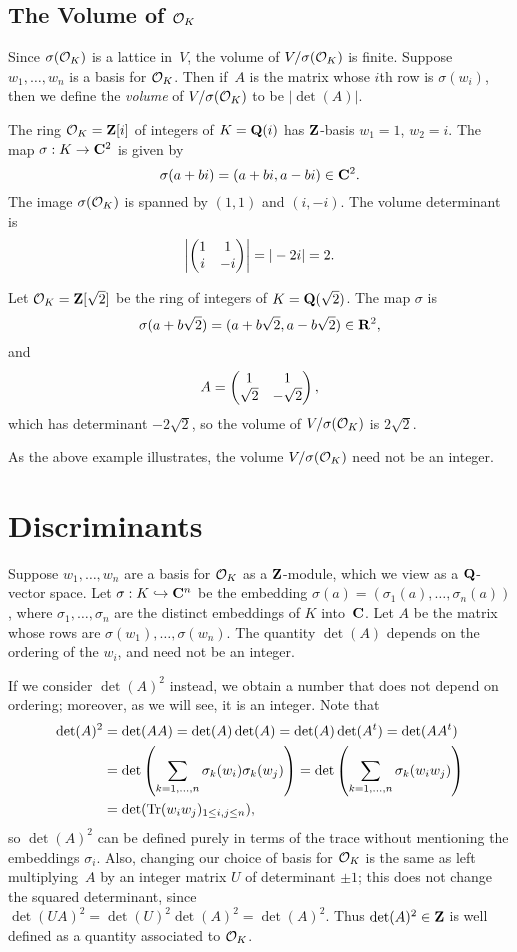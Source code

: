 \subsection{The Volume of $\mathcal{O}_K$}
Since $\sigma(\mathcal{O}_K)$ is a lattice in~$V$, the volume of
$V/\sigma(\mathcal{O}_K)$ is finite.  Suppose $w_1,\ldots, w_n$ is a basis for
$\mathcal{O}_K$.  Then if~$A$ is the matrix whose $i$th row is $\sigma(w_i)$,
then we define the {\em volume} of $V/\sigma(\mathcal{O}_K)$ to be 
$|\det(A)|$.
\begin{example}
The ring $\mathcal{O}_K=\mathbf{Z}[i]$ of integers of $K=\mathbf{Q}(i)$
has $\mathbf{Z}$-basis $w_1=1$, $w_2=i$.
The map $\sigma:K\to \mathbf{C}^2$ is given by 
$$
   \sigma(a+bi) = (a+bi,a-bi)\in\mathbf{C}^2.
$$
The image $\sigma(\mathcal{O}_K)$ is spanned by
$(1,1)$ and $(i,-i)$.  
The volume determinant is
\[
  \left|\left( \begin{matrix}1&1\\i&-i \end{matrix}\right)\right| = |-2i| = 2.
\]

Let $\mathcal{O}_K=\mathbf{Z}[\sqrt{2}]$ be the ring of integers of $K=\mathbf{Q}(\sqrt{2})$.
The map $\sigma$ is
\[
  \sigma(a+b\sqrt{2}) = (a+b\sqrt{2},a-b\sqrt{2})\in\mathbf{R}^2,
\]
and 
\[
A = \left( \begin{matrix}1&1\\\sqrt{2}&-\sqrt{2} \end{matrix}\right),
\]
which has determinant
$ -2\sqrt{2}$, so the volume of $V/\sigma(\mathcal{O}_K)$ 
is $2\sqrt{2}$.
\end{example}
As the above example illustrates, the volume $V/\sigma(\mathcal{O}_K)$ need not
be an integer.  

\section{Discriminants}\label{sec:disc}
Suppose $w_1,\ldots, w_n$ are a basis for $\mathcal{O}_K$ as a $\mathbf{Z}$-module,
which we view as a $\mathbf{Q}$-vector space.  Let $ \sigma : K\hookrightarrow \mathbf{C}^n $ be
the embedding $\sigma(a)=(\sigma_1(a),\ldots,\sigma_n(a))$, where
$\sigma_1,\ldots, \sigma_n$ are the distinct embeddings of $K$
into~$\mathbf{C}$.  Let $A$ be the matrix whose rows are $\sigma(w_1), \ldots,
\sigma(w_n)$.  The quantity $\det(A)$ depends on the ordering of the
$w_i$, and need not be an integer.

If we consider $\det(A)^2$ instead, we obtain a number that does
not depend on ordering; moreover, as we will see, it is an integer. 
Note that
\begin{align*}
\det(A)^2 &= \det(AA) = 
\det(A)\det(A)=\det(A)\det(A^t)=
\det(A A^t) \\
 &= \det\left(\sum_{k=1,\ldots,n} \sigma_k(w_i)\sigma_k(w_j)\right)
 = \det\left(\sum_{k=1,\ldots,n} \sigma_k(w_i w_j)\right)\\
 &= \det(\operatorname{Tr}(w_i w_j)_{1\leq i,j\leq n}),
\end{align*}
so $\det(A)^2$ can be defined purely in terms of the trace without
mentioning the embeddings $\sigma_i$.  Also, changing our choice of
basis for $\mathcal{O}_K$ is the same as left multiplying~$A$ by an integer
matrix $U$ of determinant $\pm 1$; this does not change the squared
determinant, since $\det(UA)^2 = \det(U)^2\det(A)^2 = \det(A)^2$.
Thus $\det(A)^2\in \mathbf{Z}$ is well defined as a quantity associated to $\mathcal{O}_K$.

